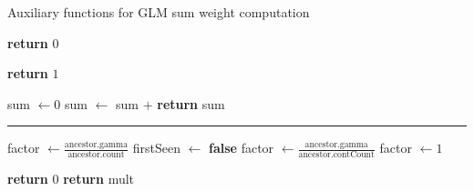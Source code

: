 \begin{algorithm}[t]
  \caption{Auxiliary functions for GLM sum weight computation}
  \label{alg:weightedsum-glm-helper}
  \begin{algorithmic}[1]
        \label{ln:highhlp-count-nonzero}
        \State \textbf{return} $0$
          \label{ln:highhlp-return-zero}
      \EndIf

      \vspace{0.7em}
        \label{ln:highhlp-isparent}
        \State \textbf{return} $1$
          \label{ln:highhlp-return-one}
      \EndIf

      \vspace{0.7em}
      \State sum $\gets 0$
        \label{ln:highhlp-init-sum}
        \label{ln:highhlp-for}
          \label{ln:highhlp-isancestor}
          \State sum $\gets$ sum $+ {}$ 
            \label{ln:highhlp-add}
        \EndIf
      \EndFor
      \State \textbf{return} sum
        \label{ln:highhlp-return}
    \EndFunction

    \vspace{0.7em}
    \Statex\hrule

        \label{ln:lowhlp-count-nonzero}
        \State factor $\gets \frac{\text{ancestor.gamma}}{\text{ancestor.count}}$
          \label{ln:lowhlp-from-highhlp}
        \State firstSeen $\gets$ \textbf{false}
          \label{ln:lowhlp-firstseen}
        \label{ln:lowhlp-contcount-nonzero}
        \State factor $\gets \frac{\text{ancestor.gamma}}{\text{ancestor.contCount}}$
          \label{ln:lowhlp-from-lowhlp}
      \Else
        \label{ln:lowhlp-else}
        \State factor $\gets 1$
          \label{ln:lowhlp-one}
      \EndIf

      \vspace{0.7em}
        \label{ln:lowhlp-isparent}
          \label{ln:lowhlp-isseen}
          \State \textbf{return} $0$
            \label{ln:lowhlp-return-zero}
        \EndIf{}
        \State \textbf{return} mult
          \label{ln:lowhlp-return-mult}
      \EndIf


\end{algorithmic}
\end{algorithm}
